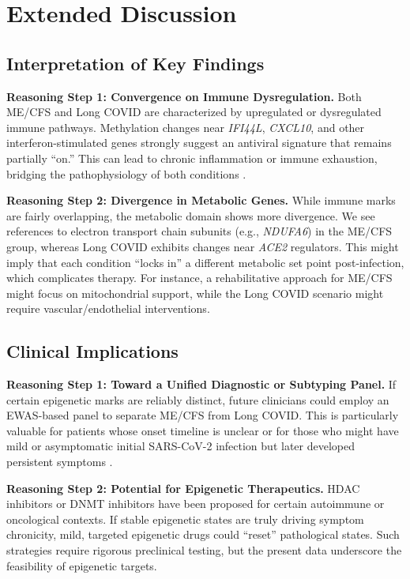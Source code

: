 \documentclass[journal]{IEEEtran}
\begin{document}
\section{Extended Discussion}\label{sec:discussion}

\subsection{Interpretation of Key Findings}
\textbf{Reasoning Step 1: Convergence on Immune Dysregulation.}
Both ME/CFS and Long COVID are characterized by upregulated or dysregulated immune pathways. Methylation changes near \textit{IFI44L}, \textit{CXCL10}, and other interferon-stimulated genes strongly suggest an antiviral signature that remains partially “on.” This can lead to chronic inflammation or immune exhaustion, bridging the pathophysiology of both conditions \cite{Balnis2022persistent}.

\textbf{Reasoning Step 2: Divergence in Metabolic Genes.}
While immune marks are fairly overlapping, the metabolic domain shows more divergence. We see references to electron transport chain subunits (e.g., \textit{NDUFA6}) in the ME/CFS group, whereas Long COVID exhibits changes near \textit{ACE2} regulators. This might imply that each condition “locks in” a different metabolic set point post-infection, which complicates therapy. For instance, a rehabilitative approach for ME/CFS might focus on mitochondrial support, while the Long COVID scenario might require vascular/endothelial interventions.

\subsection{Clinical Implications}
\textbf{Reasoning Step 1: Toward a Unified Diagnostic or Subtyping Panel.}
If certain epigenetic marks are reliably distinct, future clinicians could employ an EWAS-based panel to separate ME/CFS from Long COVID. This is particularly valuable for patients whose onset timeline is unclear or for those who might have mild or asymptomatic initial SARS-CoV-2 infection but later developed persistent symptoms \cite{Davis2023longCOVID}.

\textbf{Reasoning Step 2: Potential for Epigenetic Therapeutics.}
HDAC inhibitors or DNMT inhibitors have been proposed for certain autoimmune or oncological contexts. If stable epigenetic states are truly driving symptom chronicity, mild, targeted epigenetic drugs could “reset” pathological states. Such strategies require rigorous preclinical testing, but the present data underscore the feasibility of epigenetic targets.
\end{document}
